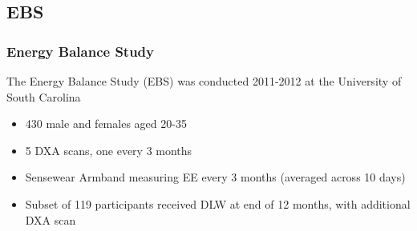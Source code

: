 \documentclass[handout]{beamer}\usepackage[]{graphicx}\usepackage[]{color}
\begin{document}
% 
% 
% 
% 
% 


\subsection{EBS}

\begin{frame}
\frametitle{Energy Balance Study}
The Energy Balance Study (EBS) was conducted 2011-2012 at the University of South Carolina
\begin{itemize}
\item
430 male and females aged 20-35 \\
\item
5 DXA scans, one every 3 months
\item
Sensewear Armband measuring EE every 3 months (averaged across 10 days)
\item
Subset of 119 participants received DLW at end of 12 months, with additional DXA scan
\end{itemize}

\vspace{0.2cm}



\end{frame}

% 
% 
% 
% 
\end{document}
